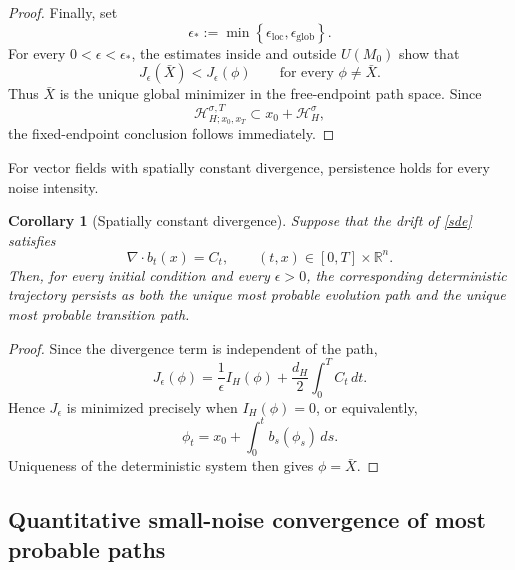 \documentclass[preprint,12pt]{elsarticle}
\newtheorem{corollary}[theorem]{Corollary}
\theoremstyle{definition}
\theoremstyle{plain}
\begin{document}
\begin{proof}
Finally, set
\begin{equation*}
    \epsilon_*
    :=
    \min
    \left\{
        \epsilon_{\mathrm{loc}},
        \epsilon_{\mathrm{glob}}
    \right\}.
\end{equation*}
For every $0<\epsilon<\epsilon_*$, the estimates inside and outside
$U(M_0)$ show that
\begin{equation*}
    J_\epsilon(\bar X)<J_\epsilon(\phi)
    \qquad
    \text{for every }\phi\neq\bar X.
\end{equation*}
Thus $\bar X$ is the unique global minimizer in the free-endpoint path
space. Since
\begin{equation*}
    \mathcal H_{H;x_0,x_T}^{\sigma,T}
    \subset
    x_0+\mathcal H_H^\sigma,
\end{equation*}
the fixed-endpoint conclusion follows immediately.
\end{proof}

For vector fields with spatially constant divergence, persistence holds
for every noise intensity.

\begin{corollary}[Spatially constant divergence]
\label{cor: spatially constant divergence}
Suppose that the drift of \eqref{sde} satisfies
\begin{equation*}
    \nabla\!\cdot b_t(x)=C_t,
    \qquad
    (t,x)\in[0,T]\times\mathbb R^n.
\end{equation*}
Then, for every initial condition and every $\epsilon>0$, the
corresponding deterministic trajectory persists as both the unique
most probable evolution path and the unique most probable transition
path.
\end{corollary}

\begin{proof}
Since the divergence term is independent of the path,
\begin{equation*}
    J_\epsilon(\phi)
    =
    \frac1\epsilon I_H(\phi)
    +
    \frac{d_H}{2}\int_0^T C_t\,dt.
\end{equation*}
Hence $J_\epsilon$ is minimized precisely when $I_H(\phi)=0$, or
equivalently,
\begin{equation*}
    \phi_t
    =
    x_0+\int_0^t b_s(\phi_s)\,ds.
\end{equation*}
Uniqueness of the deterministic system then gives $\phi=\bar X$.
\end{proof}


\subsection{Quantitative small-noise convergence of most probable  paths}
\label{subsec:quantitative-convergence}
\end{document}

